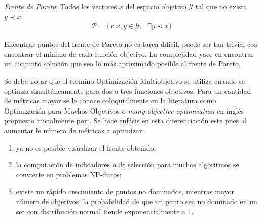 \begin{definition}
    \textit{Frente de Pareto}: Todos los vectores $x$ del espacio objetivo $\mathcal{Y}$ tal que no exista $y \prec x$.
    \begin{align*}
        \mathcal{P} = \{x| x, y \in \mathcal{Y}, \neg \exists y \prec x \} 
    \end{align*}
\end{definition}

Encontrar puntos del frente de Pareto no es tarea d\'ificil, puede ser tan trivial con encontrar el m\'inimo de cada funci\'on objetivo. La complejidad yace en encontrar un conjunto soluci\'on que sea lo m\'as aproximado posible al frente de Pareto.

Se debe notar que el termino Optimizaci\'on Multiobjetivo se utiliza cuando se optimza simult\'aneamente para dos o tres funciones objetivos. Para un cantidad de m\'etricas mayor se le conoce coloquialmente en la literatura como Optimizaci\'on para Muchos Objetivos o \textit{many-objective optimization} en ingl\'es propuesto inicialmente por \cite{10.1007/978-3-540-31880-4_2}. Se hace enf\'asis en esta  diferenciaci\'on este pues al aumentar le n\'umero de m\'etricas a optimizar:
\begin{enumerate}
    \item ya no es posible visualizar el frente obtenido;
    \item la computaci\'on de indicadores o de selecci\'on para muchos algoritmos se convierte en problemas NP-duros;
    \item existe un r\'apido crecimiento de puntos no dominados, mientras mayor n\'umero de objetivos, la probabilidad de que un punto sea no dominado en un set con distribuci\'on normal tiende exponencialmente a 1.
\end{enumerate}


